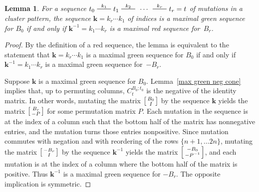 \documentclass[10pt]{article}
\newtheorem{lemma}[proposition]{Lemma}
\theoremstyle{definition}
\theoremstyle{remark}
\numberwithin{equation}{section}
\newcommand{\edge}{\,\,\rule[2.7pt]{20pt}{0.5pt}\,\,}
\newcommand{\I}{{\mathcal I}}
\newcommand{\0}{{\mathbf{0}}}
\newcommand{\kk}{{\boldsymbol{k}}}
\begin{document}
\begin{lemma}\label{max red green}
For a sequence $t_0\overset{k_1}{\edge}t_1\overset{k_2}{\edge}\,\cdots\,\overset{k_r}{\edge}t_r=t$ of mutations in a cluster pattern, the sequence $\kk=k_r\cdots k_1$ of indices is a maximal green sequence for $B_0$ if and only if $\kk^{-1}=k_1\cdots k_r$ is a maximal red sequence for~$B_r$.
\end{lemma}
\begin{proof}
By the definition of a red sequence, the lemma is equivalent to the statement that  $\kk=k_r\cdots k_1$ is a maximal green sequence for $B_0$ if and only if $\kk^{-1}=k_1\cdots k_r$ is a maximal green sequence for~$-B_r$.

Suppose $\kk$ is a maximal green sequence for $B_0$.
Lemma~\ref{max green neg cone} implies that, up to permuting columns, $C_t^{B_0;t_0}$ is the negative of the identity matrix.
In other words, mutating the matrix $\begin{bsmallmatrix}B_0\\I\end{bsmallmatrix}$ by the sequence $\kk$ yields the matrix $\begin{bsmallmatrix}B_r\\-P\end{bsmallmatrix}$ for some permutation matrix $P$.
Each mutation in the sequence is at the index of a column such that the bottom half of the matrix has nonnegative entries, and the mutation turns those entries nonpositive.
Since mutation commutes with negation and with reordering of the rows $\{n+1,\dots 2n\}$, mutating the matrix $\begin{bsmallmatrix}-B_r\\I\end{bsmallmatrix}$ by the sequence $\kk^{-1}$ yields the matrix $\begin{bsmallmatrix}-B_0\\-P^{-1}\end{bsmallmatrix}$, and each mutation is at the index of a column where the bottom half of the matrix is positive.
Thus $\kk^{-1}$ is a maximal green sequence for $-B_r$.
The opposite implication is symmetric.
\end{proof}
\end{document}

